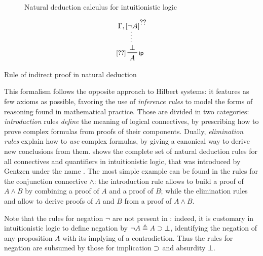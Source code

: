 \begin{figure*}
  
  \caption{Natural deduction calculus  for intuitionistic logic}
\end{figure*}

\begin{marginfigure}
  $$
  \prftree[r][l]{\rsf{ip}}{\small[\prfref<HA>]}
  {\summ
    {\Gamma, \prfboundedassumption<HA>{\neg A}}
    {\bot}}
  {A}    
  $$
  \caption{Rule of indirect proof in natural deduction}
\end{marginfigure}

This formalism follows the opposite approach to Hilbert systems: it features as
few axioms as possible, favoring the use of \emph{inference rules} to model the
forms of reasoning found in mathematical practice. Those are divided in two
categories: \emph{introduction} rules \emph{define} the meaning of logical
connectives, by prescribing how to prove complex formulas from proofs of their
components. Dually, \emph{elimination rules} explain how to \emph{use} complex
formulas, by giving a canonical way to derive new conclusions from them.
 shows the complete set of natural deduction rules for all
connectives and quantifiers in intuitionistic logic, that was introduced by
Gentzen under the name  . The most
simple example can be found in the rules for the conjunction connective $\land$:
the introduction rule  allows to build a proof of $A \land B$ by
combining a proof of $A$ and a proof of $B$; while the elimination rules
 and  allow to derive proofs of $A$ and $B$ from a
proof of $A \land B$.

\begin{remark}
  Note that the rules for negation $\neg$ are not present in
  : indeed, it is customary in intuitionistic logic to define
  negation by $\neg A \triangleq A \supset \bot$, identifying the negation of any
  proposition $A$ with its implying of a contradiction. Thus the rules for
  negation are subsumed by those for implication $\supset$ and absurdity $\bot$.
\end{remark}

